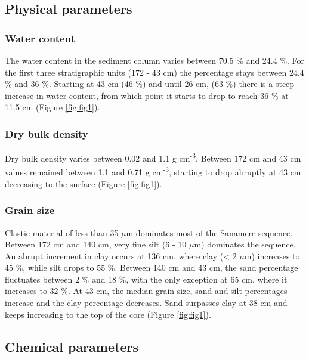 \documentclass[
  12pt,
]{book}
\begin{document}
\hypertarget{physical-parameters}{%
\subsection{Physical parameters}\label{physical-parameters}}

\hypertarget{water-content-1}{%
\subsubsection{Water content}\label{water-content-1}}

The water content in the sediment column varies between 70.5 \% and 24.4 \%. For the first three stratigraphic units (172 - 43 cm) the percentage stays between 24.4 \% and 36 \%. Starting at 43 cm (46 \%) and until 26 cm, (63 \%) there is a steep increase in water content, from which point it starts to drop to reach 36 \% at 11.5 cm (Figure \ref{fig:fig1}).

\hypertarget{dry-bulk-density-1}{%
\subsubsection{Dry bulk density}\label{dry-bulk-density-1}}

Dry bulk density varies between 0.02 and 1.1 g cm\textsuperscript{-3}. Between 172 cm and 43 cm values remained between 1.1 and 0.71 g cm\textsuperscript{-3}, starting to drop abruptly at 43 cm decreasing to the surface (Figure \ref{fig:fig1}).

\hypertarget{grain-size}{%
\subsubsection{Grain size}\label{grain-size}}

Clastic material of less than 35 \(\mu\)m dominates most of the Sanamere sequence. Between 172 cm and 140 cm, very fine silt (6 - 10 \(\mu\)m) dominates the sequence. An abrupt increment in clay occurs at 136 cm, where clay (\textless{} 2 \(\mu\)m) increases to 45 \%, while silt drops to 55 \%. Between 140 cm and 43 cm, the sand percentage fluctuates between 2 \% and 18 \%, with the only exception at 65 cm, where it increases to 32 \%. At 43 cm, the median grain size, sand and silt percentages increase and the clay percentage decreases. Sand surpasses clay at 38 cm and keeps increasing to the top of the core (Figure \ref{fig:fig1}).

\hypertarget{chemical-parameters}{%
\subsection{Chemical parameters}\label{chemical-parameters}}
\end{document}
